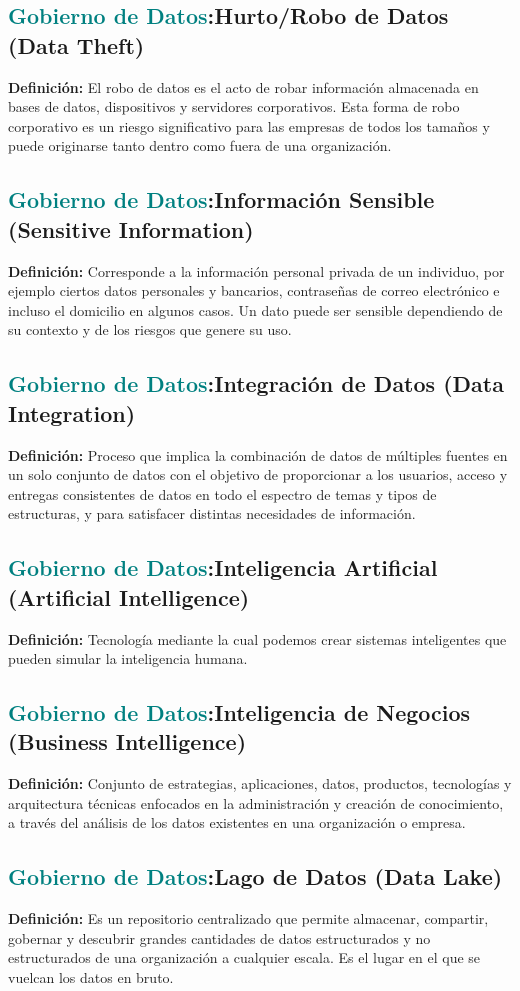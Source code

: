 \documentclass[12pt]{article}
\begin{document}
\subsection{\textcolor{teal}{Gobierno de Datos}:{Hurto/Robo de Datos (Data Theft)}}
\textbf{Definición:} El robo de datos es el acto de robar información almacenada en bases de datos, dispositivos y servidores corporativos. Esta forma de robo corporativo es un riesgo significativo para las empresas de todos los tamaños y puede originarse tanto dentro como fuera de una organización.
\subsection{\textcolor{teal}{Gobierno de Datos}:{Información Sensible (Sensitive Information)}}
\textbf{Definición:} Corresponde a la información personal privada de un individuo, por ejemplo ciertos datos personales y bancarios, contraseñas de correo electrónico e incluso el domicilio en algunos casos. Un dato puede ser sensible dependiendo de su contexto y de los riesgos que genere su uso.
\subsection{\textcolor{teal}{Gobierno de Datos}:{Integración de Datos (Data Integration)}}
\textbf{Definición:} Proceso que implica la combinación de datos de múltiples fuentes en un solo conjunto de datos con el objetivo de proporcionar a los usuarios, acceso y entregas consistentes de datos en todo el espectro de temas y tipos de estructuras, y para satisfacer distintas necesidades de información.
\subsection{\textcolor{teal}{Gobierno de Datos}:{Inteligencia Artificial (Artificial Intelligence)}}
\textbf{Definición:} Tecnología mediante la cual podemos crear sistemas inteligentes que pueden simular la inteligencia humana.
\subsection{\textcolor{teal}{Gobierno de Datos}:{Inteligencia de Negocios (Business Intelligence) }}
\textbf{Definición:} Conjunto de estrategias, aplicaciones, datos, productos, tecnologías y arquitectura técnicas enfocados en la administración y creación de conocimiento, a través del análisis de los datos existentes en una organización o empresa.
\subsection{\textcolor{teal}{Gobierno de Datos}:{Lago de Datos (Data Lake)}}
\textbf{Definición:} Es un repositorio centralizado que permite almacenar, compartir, gobernar y descubrir grandes cantidades de datos estructurados y no estructurados de una organización a cualquier escala. Es el lugar en el que se vuelcan los datos en bruto.
\end{document}
